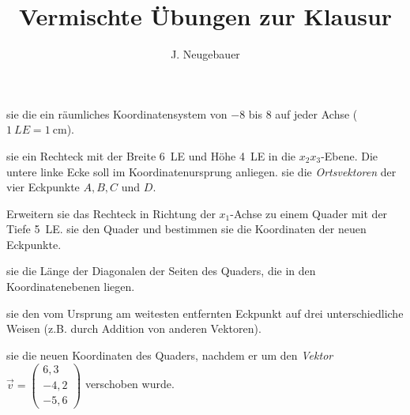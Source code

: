 \documentclass[11pt, a5paper, landscape]{scrartcl}
\author{J. Neugebauer}
\title{Vermischte Übungen zur Klausur}
\date{\Heute}
\begin{document}
	\begin{aufgabe}
		\begin{enumeratea}
			\item {} sie die ein räumliches Koordinatensystem von \num{-8} bis \num{8} auf jeder Achse ($\SI{1}{LE} = \SI{1}{\centi\meter}$).
			
			\item {} sie ein Rechteck mit der Breite \SI{6}{LE} und Höhe \SI{4}{LE} in die $x_2x_3$-Ebene. Die untere linke Ecke soll im Koordinatenursprung anliegen.  sie die \emph{Ortsvektoren} der vier Eckpunkte $A, B, C$ und $D$.
			
			\item Erweitern sie das Rechteck in Richtung der $x_1$-Achse zu einem Quader mit der Tiefe \SI{5}{LE}.  sie den Quader und bestimmen sie die Koordinaten der neuen Eckpunkte.
			
			\item {} sie die Länge der Diagonalen der Seiten des Quaders, die in den Koordinatenebenen liegen.
			
			\item {} sie den vom Ursprung am weitesten entfernten Eckpunkt auf drei unterschiedliche Weisen (z.B. durch Addition von anderen Vektoren).
			
			\item {} sie die neuen Koordinaten des Quaders, nachdem er um den \emph{Vektor} $\vec{v} = \begin{pmatrix} 6,3 \\ -4,2 \\ -5,6 \end{pmatrix}$ verschoben wurde. 
		\end{enumeratea}
	\end{aufgabe}
	\clearpage
	
\end{document}
